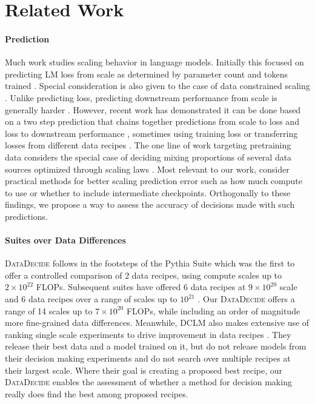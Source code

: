 \documentclass{article}
\theoremstyle{plain}
\theoremstyle{definition}
\theoremstyle{remark}
\newcommand{\numScales}{14}
\newcommand{\projSuite}{\textsc{DataDecide}}
\newcommand{\predictionError}{prediction error}
\newcommand{\rankingMethod}{ranking single scale experiments}
\begin{document}
\section{Related Work}
\paragraph{Prediction} 

Much work studies scaling behavior in language models. Initially this focused on predicting LM loss from scale as determined by parameter count and tokens trained \citep{kaplan2020scalinglawsneurallanguage,hoffmann2022trainingcomputeoptimallargelanguage}. Special consideration is also given to the case of data constrained scaling \citep{muennighoff2023scaling,goyal2024scaling}.
Unlike predicting loss, predicting downstream performance from scale is generally harder \citep{schaeffer2024why}. However, recent work has demonstrated it can be done based on a two step prediction that chains together predictions from scale to loss and loss to downstream performance
\citep{gadre2024languagemodelsscalereliably,bhagia2024establishingtaskscalinglaws,Dubey2024TheL3}, sometimes using training loss \citep{du2024understanding} or transferring losses from different data recipes \citep{brandfonbrener2024losstolosspredictionscalinglaws,ruan2024observational}. The one line of work targeting pretraining data considers the special case of deciding mixing proportions of several data sources optimized through scaling laws \citep{Kang2024AutoScaleAP,Ye2024DataML}. Most relevant to our work, \citet{choshen2024hitchhikersguidescalinglaw} consider practical methods for better scaling \predictionError{} such as how much compute to use or whether to include intermediate checkpoints. Orthogonally to these findings, we propose a way to assess the accuracy of decisions made with such predictions.


\paragraph{Suites over Data Differences} \projSuite{} follows in the footsteps of the Pythia Suite \citep{biderman2023pythiasuiteanalyzinglarge} which was the first to offer a controlled comparison of 2 data recipes, using compute scales up to $2 \times 10^{22}$ FLOPs. 
Subsequent suites have offered 6 data recipes at $9 \times 10^{20}$ scale \citep{magnusson2024palomabenchmarkevaluatinglanguage} and 6 data recipes over a range of scales up to $10^{21}$ \citep{brandfonbrener2024losstolosspredictionscalinglaws}. Our \projSuite{} offers a range of \numScales{} scales up to $7\times 10^{20}$ FLOPs, while including an order of magnitude more fine-grained data differences. 
Meanwhile, DCLM also makes extensive use of \rankingMethod{} to drive improvement in data recipes \citep{li2024datacomplmsearchgenerationtraining}. They release their best data and a model trained on it, but do not release models from their decision making experiments and do not search over multiple recipes at their largest scale. Where their goal is creating a proposed best recipe, our \projSuite{} enables the assessment of whether a method for decision making really does find the best among proposed recipes.
\end{document}
